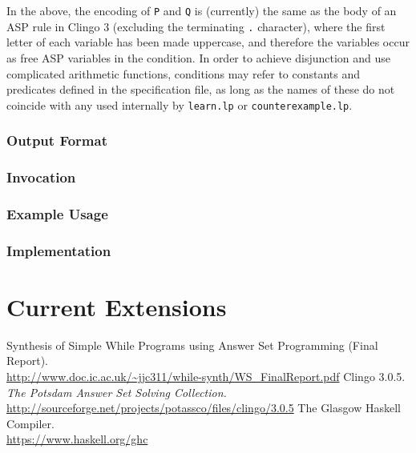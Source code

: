 \documentclass[a4paper,twoside,notitlepage,12pt]{article}
\begin{document}
In the above, the encoding of \verb|P| and \verb|Q| is (currently) the same as the body of an ASP rule in Clingo 3 (excluding the terminating 
\verb|.| character), where the first letter of each variable has been made uppercase, and therefore the variables occur as free ASP variables 
in the condition. In order to achieve disjunction and use complicated arithmetic functions, conditions may refer to constants and predicates 
defined in the specification file, as long as the names of these do not coincide with any used internally by \verb|learn.lp| or 
\verb|counterexample.lp|.

\subsubsection{Output Format} \label{sec:gnx:out}

\subsubsection{Invocation} \label{sec:gnx:inv}

\subsubsection{Example Usage} \label{sec:gnx:exu}

\subsubsection{Implementation} \label{sec:gnx:imp}

\clearpage
\section{Current Extensions} \label{sec:cur}

\clearpage
\begin{thebibliography}{9}
        Synthesis of Simple While Programs using Answer Set Programming (Final Report). 
        \\ \url{http://www.doc.ic.ac.uk/~jjc311/while-synth/WS_FinalReport.pdf}
        Clingo 3.0.5. \emph{The Potsdam Answer Set Solving Collection.}
        \\ \url{http://sourceforge.net/projects/potassco/files/clingo/3.0.5}
        The Glasgow Haskell Compiler.
        \\ \url{https://www.haskell.org/ghc}
\end{thebibliography}
\end{document}
